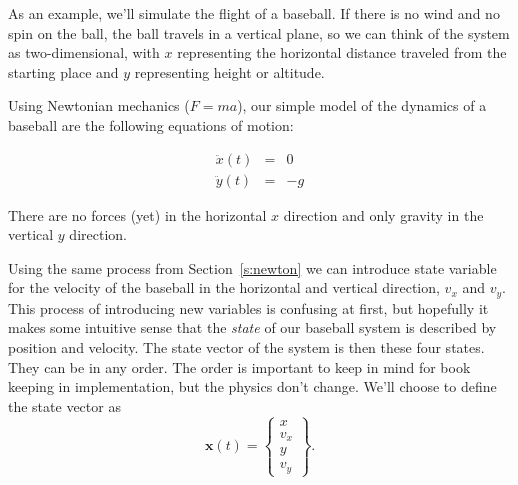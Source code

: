 As an example, we'll simulate the flight of a baseball.
If there is no wind and no spin on the ball, the ball travels in a vertical plane, so we can think of the system as two-dimensional, with $x$ representing the horizontal distance
traveled from the starting place and $y$ representing height or altitude.


Using Newtonian mechanics ($F=ma$), our simple model of the dynamics of a baseball are the following equations of motion:

\begin{eqnarray*}
    \ddot{x}(t) &=& 0 \\
    \ddot{y}(t) &=& -g
\end{eqnarray*}

There are no forces (yet) in the horizontal $x$ direction and only gravity in the vertical $y$ direction.

Using the same process from Section~\ref{s:newton} we can introduce state variable for the velocity of the baseball in the horizontal and vertical direction, $v_x$ and $v_y$.   This process of introducing new variables is confusing at first, but hopefully it makes some intuitive sense that the \emph{state} of our baseball system is described by position and velocity.  The state vector of the system is then these four states.  They can be in any order.  The order is important to keep in mind for book keeping in implementation, but the physics don't change.  We'll choose to define the state vector as
\begin{equation}\label{e:bstate}
    \mathbf{x}(t) = \left\{ \begin{array}{c}
        x \\ v_x  \\ y \\ v_y
    \end{array}\right\}.
\end{equation}

